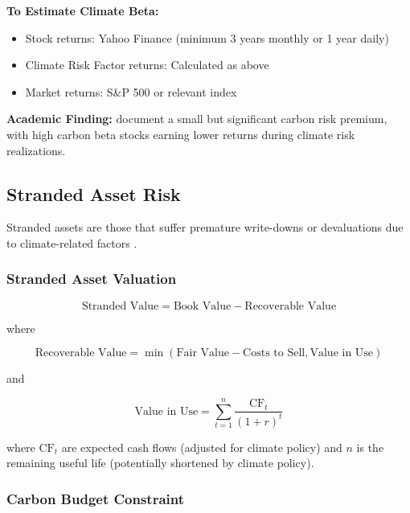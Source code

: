 \documentclass[11pt,a4paper]{article}
\begin{document}
\textbf{To Estimate Climate Beta:}
\begin{itemize}
    \item Stock returns: Yahoo Finance (minimum 3 years monthly or 1 year daily)
    \item Climate Risk Factor returns: Calculated as above
    \item Market returns: S\&P 500 or relevant index
\end{itemize}

\textbf{Academic Finding:} \citet{Huij2023} document a small but significant carbon risk premium, with high carbon beta stocks earning lower returns during climate risk realizations.

\subsection{Stranded Asset Risk}

Stranded assets are those that suffer premature write-downs or devaluations due to climate-related factors \citep{Semieniuk2022, Caldecott2017}.

\subsubsection{Stranded Asset Valuation}

\begin{equation}
\text{Stranded Value} = \text{Book Value} - \text{Recoverable Value}
\end{equation}

where

\begin{equation}
\text{Recoverable Value} = \min(\text{Fair Value} - \text{Costs to Sell}, \text{Value in Use})
\end{equation}

and

\begin{equation}
\text{Value in Use} = \sum_{t=1}^{n} \frac{\text{CF}_t}{(1+r)^t}
\end{equation}

where $\text{CF}_t$ are expected cash flows (adjusted for climate policy) and $n$ is the remaining useful life (potentially shortened by climate policy).

\subsubsection{Carbon Budget Constraint}
\end{document}
